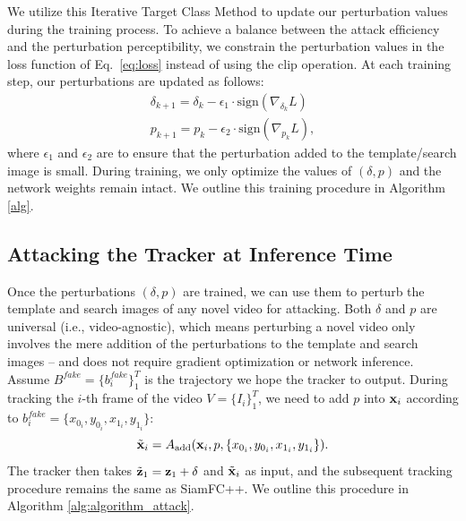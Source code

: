 \documentclass[journal]{IEEEtran}
\newcommand{\ie}{i.e.}
\begin{document}
We utilize this Iterative Target Class Method to update our perturbation values during the training process. To achieve a balance between the attack efﬁciency and the perturbation perceptibility, we constrain the perturbation values in the loss function of Eq.~\eqref{eq:loss} instead of using the clip operation. At each training step, our perturbations are updated as follows:
\begin{gather}
\delta_{k+1} = \delta_{k} - \epsilon_1 \cdot \text{sign}(\nabla_{\delta_k}L)\\
p_{k+1} = p_{k} - \epsilon_2 \cdot \text{sign}(\nabla_{p_k}L),
\end{gather}
where $\epsilon_1$ and $\epsilon_2$ are to ensure that the perturbation added to the template/search image is small. During training, we only optimize the values of $(\delta, p)$ and the network weights remain intact. We outline this training procedure in Algorithm \ref{alg}.

\subsection{Attacking the Tracker at Inference Time}

Once the perturbations $(\delta, p)$ are trained, we can use them to perturb the template and search images of any novel video for attacking. Both $\delta$ and $p$ are universal (\ie, video-agnostic), which means perturbing a novel video only involves the mere addition of the perturbations to the template and search images -- and does not require gradient optimization or network inference. Assume $B^{fake}=\{b^{fake}_i\}_1^{T}$ is the trajectory we hope the tracker to output. During tracking the $i$-th frame of the video $V=\{I_i\}_1^T$, we need to add $p$ into $\textbf x_i$ according to $b^{fake}_i=\{x_{0_i}, y_{0_i}, x_{1_i}, y_{1_i}\}$:
\begin{equation}
\tilde{\textbf x}_i = A_{\text{add}}(\textbf x_i, p, \{x_{0_i}, y_{0_i}, x_{1_i}, y_{1_i}\}).
\end{equation}
The tracker then takes $\tilde{\textbf z}_1=\textbf z_1+\delta$ and $\tilde{ \textbf x}_i$ as input, and the subsequent tracking procedure remains the same as SiamFC++. We outline this procedure in Algorithm \ref{alg:algorithm_attack}.
\end{document}
